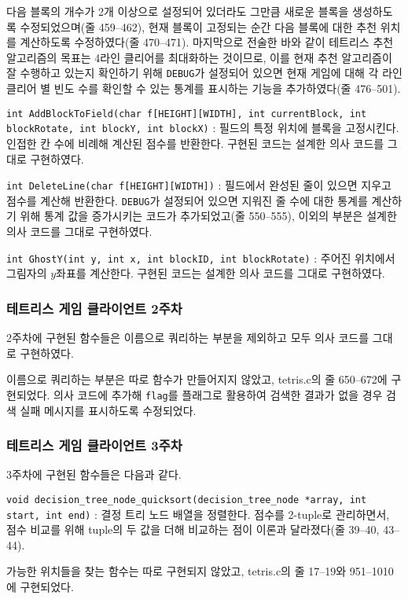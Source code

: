 다음 블록의 개수가 2개 이상으로 설정되어 있더라도 그만큼 새로운 블록을 생성하도록 수정되었으며(줄 459--462), 현재 블록이 고정되는 순간 다음 블록에 대한
추천 위치를 계산하도록 수정하였다(줄 470--471). 마지막으로 전술한 바와 같이 테트리스 추천 알고리즘의 목표는 4라인 클리어를 최대화하는 것이므로,
이를 현재 추천 알고리즘이 잘 수행하고 있는지 확인하기 위해 \texttt{DEBUG}가 설정되어 있으면 현재 게임에 대해 각 라인 클리어 별 빈도 수를
확인할 수 있는 통계를 표시하는 기능을 추가하였다(줄 476--501).

\texttt{int AddBlockToField(char f[HEIGHT][WIDTH], int currentBlock, int blockRotate, int blockY, int blockX)}
: 필드의 특정 위치에 블록을 고정시킨다. 인접한 칸 수에 비례해 계산된 점수를 반환한다. 구현된 코드는 설계한 의사 코드를 그대로 구현하였다.

\texttt{int DeleteLine(char f[HEIGHT][WIDTH])}
: 필드에서 완성된 줄이 있으면 지우고 점수를 계산해 반환한다.
\texttt{DEBUG}가 설정되어 있으면 지워진 줄 수에 대한 통계를 계산하기 위해 통계 값을 증가시키는 코드가
추가되었고(줄 550--555), 이외의 부분은 설계한 의사 코드를 그대로 구현하였다.

\texttt{int GhostY(int y, int x, int blockID, int blockRotate)}
: 주어진 위치에서 그림자의 $y$좌표를 계산한다. 구현된 코드는 설계한 의사 코드를 그대로 구현하였다.

\subsubsection{테트리스 게임 클라이언트 2주차} 2주차에 구현된 함수들은 이름으로 쿼리하는 부분을 제외하고
모두 의사 코드를 그대로 구현하였다.

이름으로 쿼리하는 부분은 따로 함수가 만들어지지 않았고, tetris.c의 줄 650--672에 구현되었다. 의사 코드에 추가해
\texttt{flag}를 플래그로 활용하여 검색한 결과가 없을 경우 검색 실패 메시지를 표시하도록 수정되었다.

\subsubsection{테트리스 게임 클라이언트 3주차} 3주차에 구현된 함수들은 다음과 같다.

\texttt{void decision_tree_node_quicksort(decision_tree_node *array, int start, int end)}
: 결정 트리 노드 배열을 정렬한다. 점수를 2-tuple로 관리하면서, 점수 비교를 위해 tuple의 두 값을 더해 비교하는 점이
이론과 달라졌다(줄 39--40, 43--44).

가능한 위치들을 찾는 함수는 따로 구현되지 않았고, tetris.c의 줄 17--19와 951--1010에 구현되었다.

